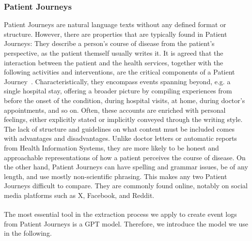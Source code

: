 \subsubsection*{Patient Journeys}\label{sec:pj}
Patient Journeys are natural language texts without any defined format or structure. However, there are properties that are typically found in Patient Journeys: They describe a person's course of disease from the patient's perspective, as the patient themself usually writes it. It is agreed that the interaction between the patient and the health services, together with the following activities and interventions, are the critical components of a Patient Journey~\cite{ferrara_engaging_2019, kuo_rosacea_2015}. Characteristically, they encompass events spanning beyond, e.g. a single hospital stay, offering a broader picture by compiling experiences from before the onset of the condition, during hospital visits, at home, during doctor's appointments, and so on. Often, these accounts are enriched with personal feelings, either explicitly stated or implicitly conveyed through the writing style. The lack of structure and guidelines on what content must be included comes with advantages and disadvantages. Unlike doctor letters or automatic reports from Health Information Systems, they are more likely to be honest and approachable representations of how a patient perceives the course of disease.
On the other hand, Patient Journeys can have spelling and grammar issues, be of any length, and use mostly non-scientific phrasing. This makes any two Patient Journeys difficult to compare. They are commonly found online, notably on social media platforms such as X, Facebook, and Reddit.\\\\
The most essential tool in the extraction process we apply to create event logs from Patient Journeys is a GPT model. Therefore, we introduce the model we use in the following.

